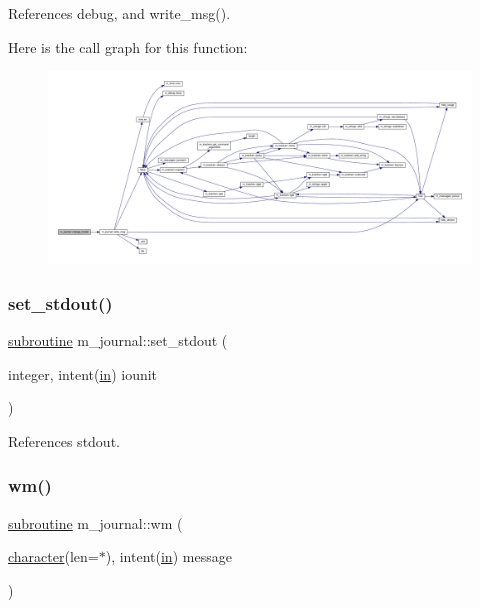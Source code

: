 References debug, and write\+\_\+msg().

Here is the call graph for this function\+:
\nopagebreak
\begin{figure}[H]
\begin{center}
\leavevmode
\includegraphics[width=350pt]{namespacem__journal_a358c4bd99444e0e946b3aaba5f278698_cgraph}
\end{center}
\end{figure}
\mbox{\label{namespacem__journal_a0f2ac99f3da62381d2466c150830b9e0}} 
\subsubsection{\texorpdfstring{set\+\_\+stdout()}{set\_stdout()}}
{\footnotesize\ttfamily \hyperlink{M__stopwatch_83_8txt_acfbcff50169d691ff02d4a123ed70482}{subroutine} m\+\_\+journal\+::set\+\_\+stdout (\begin{DoxyParamCaption}\item[{integer, intent(\hyperlink{M__journal_83_8txt_afce72651d1eed785a2132bee863b2f38}{in})}]{iounit }\end{DoxyParamCaption})\hspace{0.3cm}{\ttfamily [private]}}



References stdout.

\mbox{\label{namespacem__journal_a98479e5ace98340f7519470b96d3197d}} 
\subsubsection{\texorpdfstring{wm()}{wm()}}
{\footnotesize\ttfamily \hyperlink{M__stopwatch_83_8txt_acfbcff50169d691ff02d4a123ed70482}{subroutine} m\+\_\+journal\+::wm (\begin{DoxyParamCaption}\item[{\hyperlink{option__stopwatch_83_8txt_abd4b21fbbd175834027b5224bfe97e66}{character}(len=$\ast$), intent(\hyperlink{M__journal_83_8txt_afce72651d1eed785a2132bee863b2f38}{in})}]{message }\end{DoxyParamCaption})\hspace{0.3cm}{\ttfamily [private]}}



